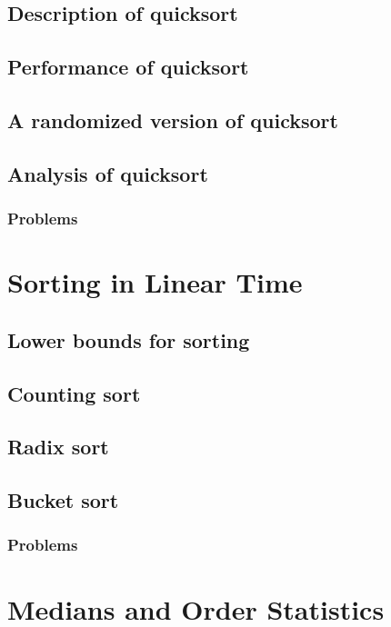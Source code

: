 \documentclass[fontsize=12pt,paper=a4,open=any]{book}
\begin{document}
\section{Description of quicksort}

\section{Performance of quicksort}

\section{A randomized version of quicksort}

\section{Analysis of quicksort}

\subsection*{Problems}


\chapter{Sorting in Linear Time}

\section{Lower bounds for sorting}

\section{Counting sort}

\section{Radix sort}

\section{Bucket sort}

\subsection*{Problems}


\chapter{Medians and Order Statistics}
\end{document}
